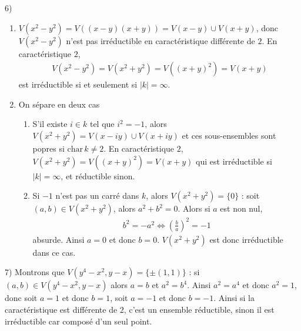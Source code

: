         \begin{question}{6)}
            \begin{enumerate}
                \item $V(x^2 - y^2) = V((x - y)(x + y)) = V(x - y) \cup V(x + y)$, donc $V(x^2 - y^2)$ n'est pas irréductible en caractéristique différente de $2$. En caractéristique $2$,
                \begin{align*}
                    V(x^2 - y^2) = V(x^2 + y^2) = V((x + y)^2) = V(x + y)
                \end{align*}
                est irréductible si et seulement si $|k| = \infty$.
                \item On sépare en deux cas
                \begin{enumerate}
                    \item S'il existe $i \in k$ tel que $i^2 = -1$, alors $V(x^2 + y^2) = V(x - iy) \cup V(x + iy)$ et ces sous-ensembles sont popres si $\mathrm{char} \, k \neq 2$. En caractéristique $2$, $V(x^2 + y^2) = V((x + y)^2) = V(x + y)$ qui est irréductible si $|k| = \infty$, et réductible sinon.
                    \item Si $-1$ n'est pas un carré dans $k$, alors $V(x^2 + y^2) = \{0\}$ : soit $(a,b) \in V(x^2 + y^2)$, alors $a^2 + b^2 = 0$. Alors si $a$ est non nul,
                    \begin{align*}
                        b^2 = -a^2 \iff \left( \frac{b}{a} \right)^2 = -1
                    \end{align*}
                    absurde. Ainsi $a = 0$ et donc $b = 0$. $V(x^2 + y^2)$ est donc irréductible dans ce cas. 
                \end{enumerate}
            \end{enumerate}
        \end{question}
        \begin{question}{7)}
            Montrons que $V(y^4 - x^2, y - x) = \{\pm (1,1)\}$ : si $(a,b) \in V(y^4 - x^2, y - x)$ alors $a = b$ et $a^2 = b^4$. Ainsi $a^2 = a^4$ et donc $a^2 = 1$, donc soit $a = 1$ et donc $b = 1$, soit $a = -1$ et donc $b = -1$. Ainsi si la caractéristique est différente de $2$, c'est un ensemble réductible, sinon il est irréductible car composé d'un seul point.
        \end{question}
